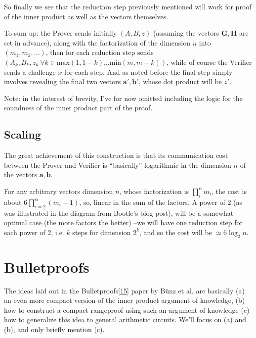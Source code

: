 \documentclass[10pt,a4paper]{article}
\begin{document}
So finally we see that the reduction step previously mentioned will work
for proof of the inner product as well as the vectors themselves.

To sum up: the Prover sends initially $(A, B, z)$ (assuming the vectors $\mathbf{G},\mathbf{H}$ are set in
advance), along with the factorization of the dimension $n$ into $(m_1,m_2,\ldots)$, then for
each reduction step sends $(A_k, B_k, z_k \  \forall k \in \textrm{max}(1, 1-k) \ldots \textrm{min}(m, m-k))$, while of course the Verifier sends a
challenge $x$ for each step. And as noted before the final step simply
involves revealing the final two vectors $\mathbf{a}',\mathbf{b}'$, whose dot product will be $z'$.

Note: in the interest of brevity, I've for now omitted including the
logic for the soundness of the inner product part of the proof.

\hypertarget{scaling}{%
\subsection[Scaling]{\texorpdfstring{\protect\hypertarget{anchor-47}{}{}Scaling}{Scaling}}\label{scaling}}

The great achievement of this construction is that its communication
cost between the Prover and Verifier is ``basically'' logarithmic in the
dimension $n$ of the vectors $\mathbf{a},\mathbf{b}$.

For any arbitrary vectors dimension $n$, whose factorization is $\prod_i^\alpha m_i$, the cost
is about $6\prod_{i=2}^\alpha (m_i - 1)$, so, linear in the sum of the factors. A power of 2 (as was
illustrated in the diagram from Bootle's blog post), will be a somewhat
optimal case (the more factors the better) --we will have one reduction
step for each power of 2, i.e. $k$ steps for dimension $2^k$, and so the cost
will be $\simeq 6 \log_2 n$.

\hypertarget{bulletproofs}{%
\section[Bulletproofs]{\texorpdfstring{\protect\hypertarget{anchor-48}{}{}Bulletproofs}{Bulletproofs}}\label{bulletproofs}}

The ideas laid out in the
Bulletproofs{[}\protect\hyperlink{anchor-6}{15}{]} paper by Bünz et al.
are basically (a) an even more compact version of the inner product
argument of knowledge, (b) how to construct a compact rangeproof using
such an argument of knowledge (c) how to generalize this idea to general
arithmetic circuits. We'll focus on (a) and (b), and only briefly
mention (c).
\end{document}

